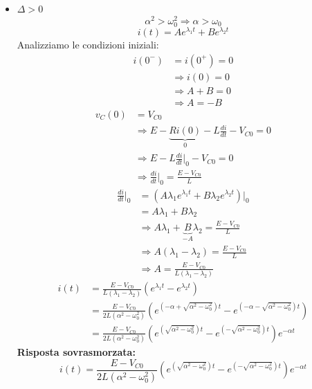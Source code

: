 \documentclass{article}
\begin{document}
    \begin{itemize}
        \item $\Delta > 0$
        \[ \alpha^2 > \omega^2_0 \Rightarrow \alpha > \omega_0 \]
        \[i(t) = A e^{\lambda_1t}+Be^{\lambda_2t}\]
        Analizziamo le condizioni iniziali:
        \begin{align*}
            i(0^-) &= i(0^+) = 0\\
            &\Rightarrow i(0) = 0\\
            &\Rightarrow A+B = 0\\
            &\Rightarrow A = -B 
        \end{align*}
        \begin{align*}
            v_C(0) &= V_{C0}\\
            &\Rightarrow E - \underbrace{Ri(0)}_{0} - L\frac{di}{dt} - V_{C0} = 0\\
            &\Rightarrow E - L \frac{di}{dt}\bigg|_0 - V_{C0} = 0\\
            &\Rightarrow \frac{di}{dt}\bigg|_0 = \frac{E-V_{C0}}{L}
        \end{align*}
        \begin{align*}
            \frac{di}{dt}\bigg|_0 &= \left(A\lambda_1e^{\lambda_1t} +B\lambda_2e^{\lambda_2t} \right) \big|_0\\
            &= A \lambda_1 + B\lambda_2\\
            &\Rightarrow A \lambda_1 + \underbrace{B}_{-A}\lambda_2 = \frac{E-V_{C0}}{L}\\
            &\Rightarrow A(\lambda_1 - \lambda_2) = \frac{E-V_{C0}}{L}\\
            &\Rightarrow A = \frac{E-V_{C0}}{L(\lambda_1-\lambda_2)}
        \end{align*}
        \begin{align*}
            i(t) &= \frac{E-V_{C0}}{L(\lambda_1-\lambda_2)}(e^{\lambda_1 t} - e^{\lambda_2 t})\\
            &= \frac{E-V_{C0}}{2L(\alpha^2 - \omega^2_0)} \left( e^{\left(-\alpha+\sqrt{\alpha^2 - \omega^2_0}\right)t} - e^{\left(-\alpha-\sqrt{\alpha^2 - \omega^2_0}\right)t}\right)\\
            &=\frac{E-V_{C0}}{2L(\alpha^2 - \omega^2_0)} \left( e^{\left(\sqrt{\alpha^2 - \omega^2_0}\right)t} - e^{\left(-\sqrt{\alpha^2 - \omega^2_0}\right)t}\right) e^{-\alpha t}
        \end{align*}
        \textbf{Risposta sovrasmorzata:}
        \[i(t) = \frac{E-V_{C0}}{2L(\alpha^2 - \omega^2_0)} \left( e^{\left(\sqrt{\alpha^2 - \omega^2_0}\right)t} - e^{\left(-\sqrt{\alpha^2 - \omega^2_0}\right)t}\right) e^{-\alpha t}\]

\end{itemize}
\end{document}
